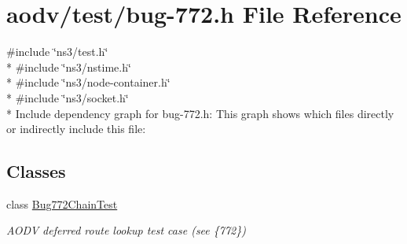 \hypertarget{bug-772_8h}{}\section{aodv/test/bug-\/772.h File Reference}
\label{bug-772_8h}
{\ttfamily \#include \char`\"{}ns3/test.\+h\char`\"{}}\\*
{\ttfamily \#include \char`\"{}ns3/nstime.\+h\char`\"{}}\\*
{\ttfamily \#include \char`\"{}ns3/node-\/container.\+h\char`\"{}}\\*
{\ttfamily \#include \char`\"{}ns3/socket.\+h\char`\"{}}\\*
Include dependency graph for bug-\/772.h\+:
This graph shows which files directly or indirectly include this file\+:
\subsection*{Classes}
\begin{DoxyCompactItemize}
\item 
class \hyperlink{classBug772ChainTest}{Bug772\+Chain\+Test}
\begin{DoxyCompactList}\small\item\em A\+O\+DV deferred route lookup test case (see \{772\}) \end{DoxyCompactList}\end{DoxyCompactItemize}
